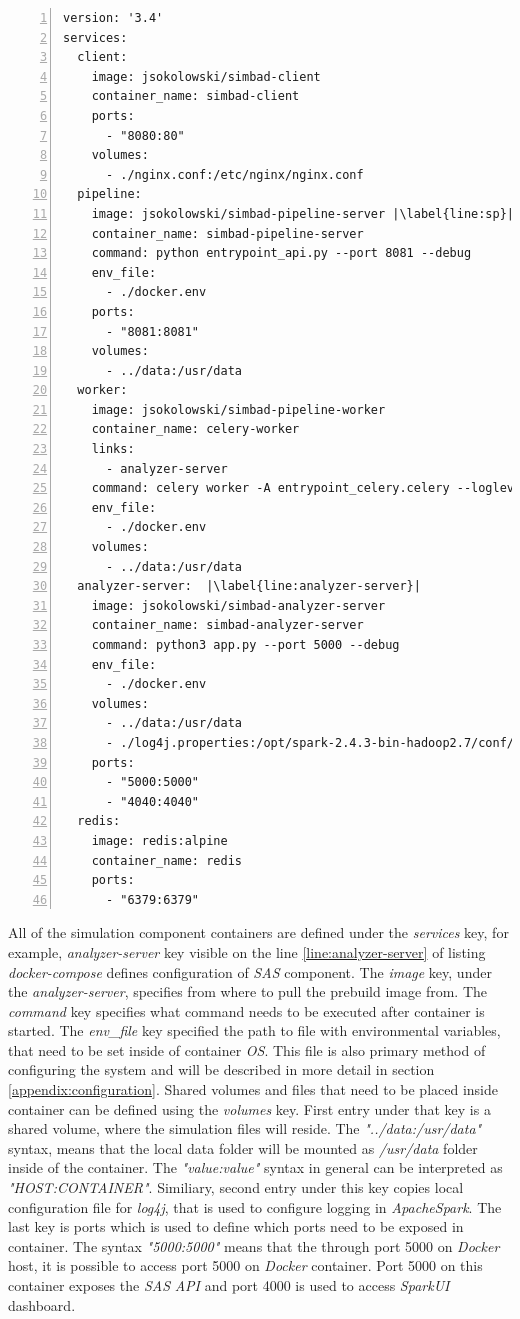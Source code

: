 \begin{lstlisting}[label=list:docker-compose,caption=prod-docker-compose.yml file, basicstyle=\footnotesize\ttfamily, numbers=left, escapechar=|]
version: '3.4'
services:
  client:
    image: jsokolowski/simbad-client
    container_name: simbad-client
    ports:
      - "8080:80"
    volumes:
      - ./nginx.conf:/etc/nginx/nginx.conf
  pipeline:
    image: jsokolowski/simbad-pipeline-server |\label{line:sp}|
    container_name: simbad-pipeline-server
    command: python entrypoint_api.py --port 8081 --debug
    env_file:
      - ./docker.env
    ports:
      - "8081:8081"
    volumes:
      - ../data:/usr/data
  worker:
    image: jsokolowski/simbad-pipeline-worker
    container_name: celery-worker
    links:
      - analyzer-server
    command: celery worker -A entrypoint_celery.celery --loglevel=info
    env_file:
      - ./docker.env
    volumes:
      - ../data:/usr/data
  analyzer-server:  |\label{line:analyzer-server}|
    image: jsokolowski/simbad-analyzer-server
    container_name: simbad-analyzer-server
    command: python3 app.py --port 5000 --debug
    env_file:
      - ./docker.env
    volumes:
      - ../data:/usr/data
      - ./log4j.properties:/opt/spark-2.4.3-bin-hadoop2.7/conf/log4j.properties
    ports:
      - "5000:5000"
      - "4040:4040"
  redis:
    image: redis:alpine
    container_name: redis
    ports:
      - "6379:6379"
\end{lstlisting}
All of the simulation component containers are defined under the \textit{services} key, for example, \textit{analyzer-server} key visible on the line \ref{line:analyzer-server} of listing \textit{docker-compose} defines configuration of \textit{SAS} component. The \textit{image} key, under the \textit{analyzer-server}, specifies from where to pull the prebuild image from. The \textit{command} key specifies what command needs to be executed after container is started. The \textit{env\_file} key specified the path to file with environmental variables, that need to be set inside of container \textit{OS}. This file is also primary method of configuring the system and will be described in more detail in section \ref{appendix:configuration}. Shared volumes and files that need to be placed inside container can be defined using the \textit{volumes} key. First entry under that key is a shared volume, where the simulation files will reside. The \textit{"../data:/usr/data"} syntax, means that the local data folder will be mounted as \textit{/usr/data} folder inside of the container. The \textit{"value:value"} syntax in general can be interpreted as \textit{"HOST:CONTAINER"}. Similiary, second entry under this key copies local configuration file for \textit{log4j}, that is used to configure logging in \textit{ApacheSpark}. The last key is ports which is used to define which ports need to be exposed in container. The syntax \textit{"5000:5000"} means that the through port 5000 on \textit{Docker} host, it is possible to access port 5000 on \textit{Docker} container. Port 5000 on this container exposes the  \textit{SAS} \textit{API} and port 4000 is used to access \textit{SparkUI} dashboard.
